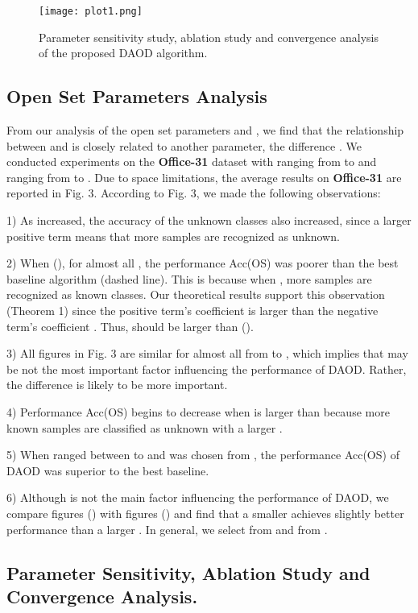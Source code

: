 \documentclass[journal]{IEEEtran}
\begin{document}
\begin{figure*}[h]
\centering
\texttt{[image: plot1.png]}
~~~~~~~~\caption{Parameter sensitivity study, ablation study and convergence analysis of the proposed DAOD algorithm.}
\end{figure*}


\subsection{Open Set Parameters Analysis} From our analysis of the open set parameters  and , we find that the relationship between  and  is closely related to another parameter, the difference . We conducted experiments on the \textbf{Office-31} dataset with  ranging from  to  and  ranging from  to . Due to space limitations, the average results on \textbf{Office-31} are reported in Fig. 3. According to Fig. 3, we made the following observations:

1) As  increased, the accuracy of the unknown classes also increased, since a larger positive term  means that more samples are recognized as unknown.


2) When  (), for almost all , the performance Acc(OS) was poorer than the best baseline algorithm (dashed line). This is because when , more samples are recognized as known classes.  Our theoretical results support this observation (Theorem 1) since the positive term’s coefficient  is larger than the negative term's coefficient . Thus,  should be larger than  ().

3) All figures in Fig. 3 are similar for almost all  from  to ,  which implies that   may be not the most important factor influencing the performance of DAOD. Rather, the difference  is likely to be more important.


4)	Performance Acc(OS) begins to decrease when  is larger than  because more known samples are classified as unknown with a larger .

5) When  ranged between  to  and  was chosen from , the performance Acc(OS) of DAOD  was superior to the best baseline.

6) Although  is not the main factor influencing the performance of DAOD, we compare figures () with figures () and find that a smaller  achieves slightly better performance than a larger . In general, we select  from   and  from .

 \subsection{{Parameter Sensitivity, Ablation Study and Convergence Analysis. }}
 
\end{document}

